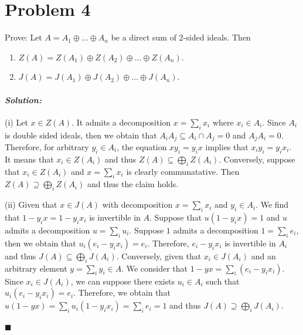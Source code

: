 \documentclass[12pt, a4paper]{article}
\theoremstyle{remark}
\newenvironment{solution}
  {\paragraph{\textit{Solution:}}\par\medskip}
  {\hfill$\blacksquare$\vspace{0.1cm}}
\begin{document}
\section*{Problem 4}
Prove: Let $A = A_1 \oplus \dots \oplus A_n$ be a direct sum of 2-sided ideals. Then
\begin{enumerate}
    \item[(i)] $Z(A) = Z(A_1) \oplus Z(A_2) \oplus \dots \oplus Z(A_n)$.
    \item[(ii)] $J(A) = J(A_1) \oplus J(A_2) \oplus \dots \oplus J(A_n)$.
\end{enumerate}
\begin{solution}
    (i) Let $x\in Z(A)$. It admits a decomposition $x = \sum_i x_i$ where $x_i\in A_i$.
    Since $A_i$ is double sided ideals, then we obtain that $A_iA_j\subseteq A_i\cap A_j = 0$ and $A_jA_i=0$. Therefore, 
    for arbitrary $y_i\in A_i$, the equation $xy_i=y_ix$ implies that $x_iy_i=y_ix_i$. It means that $x_i\in Z(A_i)$ and thus $Z(A)\subseteq \bigoplus_i Z(A_i)$.
    Conversely, suppose that $x_i\in Z(A_i)$ and $x=\sum_ix_i$ is clearly communatative. Then $Z(A)\supseteq \bigoplus_i Z(A_i)$ and thus the claim holds.

    (ii) Given that $x\in J(A)$ with decomposition $x=\sum_i x_i$ and $y_i\in A_i$. We find that $1-y_ix=1-y_ix_i$ is invertible in $A$. Suppose that $u(1-y_ix)=1$ and $u$ admits a decomposition $u=\sum_i u_i$.
    Suppose $1$ admits a decomposition $1=\sum_i e_i$, then we obtain that $u_i(e_i -y_ix_i)=e_i$. Therefore, $e_i-y_ix_i$ is invertible in $A_i$ and thus $J(A)\subseteq \bigoplus_i J(A_i)$.
    Conversely, given that $x_i\in J(A_i)$ and an arbitrary element $y=\sum_i y_i\in A$. We consider that $1-yx=\sum_i (e_i-y_ix_i)$. Since $x_i\in J(A_i)$, we can suppose there exists $u_i\in A_i$ such that $u_i(e_i-y_ix_i)=e_i$.
    Therefore, we obtain that $u(1-yx)=\sum_i u_i(1-y_ix_i)=\sum_i e_i = 1$ and thus $J(A)\supseteq \bigoplus_i J(A_i)$.
    
\end{solution}


\end{document}
